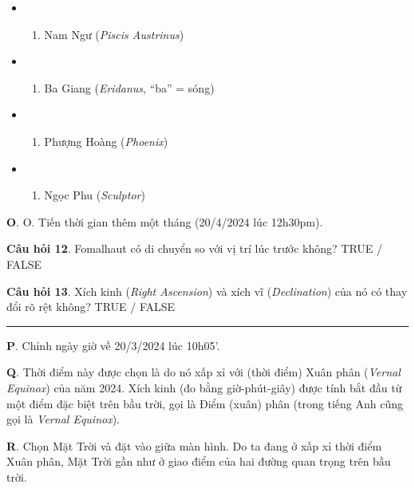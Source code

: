 \documentclass[
  a4paper,
]{book}
\providecommand{\tightlist}{%
  \setlength{\itemsep}{0pt}\setlength{\parskip}{0pt}}
\begin{document}
\begin{itemize}
\tightlist
\item
  \begin{enumerate}
  \def\labelenumi{(\Alph{enumi})}
  \tightlist
  \item
    Nam Ngư (\emph{Piscis Austrinus})\\
  \end{enumerate}
\item
  \begin{enumerate}
  \def\labelenumi{(\Alph{enumi})}
  \setcounter{enumi}{1}
  \tightlist
  \item
    Ba Giang (\emph{Eridanus}, ``ba'' = sóng)\\
  \end{enumerate}
\item
  \begin{enumerate}
  \def\labelenumi{(\Alph{enumi})}
  \setcounter{enumi}{2}
  \tightlist
  \item
    Phượng Hoàng (\emph{Phoenix})\\
  \end{enumerate}
\item
  \begin{enumerate}
  \def\labelenumi{(\Alph{enumi})}
  \setcounter{enumi}{3}
  \tightlist
  \item
    Ngọc Phu (\emph{Sculptor})
  \end{enumerate}
\end{itemize}

\textbf{O}. O. Tiến thời gian thêm một tháng (20/4/2024 lúc 12h30pm).

\textbf{Câu hỏi 12}. Fomalhaut có di chuyển so với vị trí lúc trước không?
TRUE / FALSE

\textbf{Câu hỏi 13}. Xích kinh (\emph{Right Ascension}) và xích vĩ (\emph{Declination}) của nó có thay đổi rõ rệt không?
TRUE / FALSE

\begin{center}\rule{0.5\linewidth}{0.5pt}\end{center}

\textbf{P}. Chỉnh ngày giờ về 20/3/2024 lúc 10h05'.

\textbf{Q}. Thời điểm này được chọn là do nó xấp xỉ với (thời điểm) Xuân phân (\emph{Vernal Equinox}) của năm 2024. Xích kinh (đo bằng giờ-phút-giây) được tính bắt đầu từ một điểm đặc biệt trên bầu trời, gọi là Điểm (xuân) phân (trong tiếng Anh cũng gọi là \emph{Vernal Equinox}).

\textbf{R}. Chọn Mặt Trời và đặt vào giữa màn hình. Do ta đang ở xấp xỉ thời điểm Xuân phân, Mặt Trời gần như ở giao điểm của hai đường quan trọng trên bầu trời.
\end{document}
